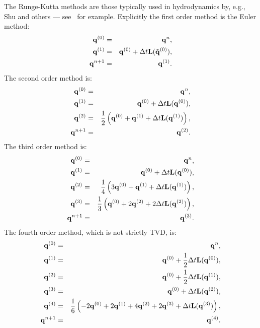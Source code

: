 The Runge-Kutta methods are those typically used in hydrodynamics by,
e.g., Shu and others --- see~\cite{CactusBase_MoL_Shu99} for
example. Explicitly the first order method is the Euler method:
\begin{eqnarray}
  \label{CactusBase_MoL_eq:rk1}
  {\bf q}^{(0)} & = & {\bf q}^{n}, \\
  {\bf q}^{(1)} & = & {\bf q}^{(0)} +  \Delta t {\bf L}(\tilde{{\bf
      q}}^{(0)}), \\
  {\bf q}^{n+1} & = & {\bf q}^{(1)}.
\end{eqnarray}
The second order method is:
\begin{eqnarray}
  \label{CactusBase_MoL_eq:rk2}
  {\bf q}^{(0)} & = & {\bf q}^{n}, \\
  {\bf q}^{(1)} & = & {\bf q}^{(0)} + \Delta t {\bf L} ({\bf q}^{(0)}), \\
  {\bf q}^{(2)} & = & \frac{1}{2} \left( {\bf q}^{(0)} + {\bf q}^{(1)}
    + \Delta t {\bf L} ({\bf q}^{(1)}) \right), \\
  {\bf q}^{n+1} & = & {\bf q}^{(2)}.
\end{eqnarray}
The third order method is:
\begin{eqnarray}
  \label{CactusBase_MoL_eq:rk3}
  {\bf q}^{(0)} & = & {\bf q}^{n}, \\
  {\bf q}^{(1)} & = & {\bf q}^{(0)} + \Delta t {\bf L} ({\bf q}^{(0)}), \\
  {\bf q}^{(2)} & = & \frac{1}{4} \left( 3 {\bf q}^{(0)} + {\bf q}^{(1)} +
    \Delta t {\bf L} ({\bf q}^{(1)}) \right), \\
  {\bf q}^{(3)} & = & \frac{1}{3} \left( {\bf q}^{(0)} + 2 {\bf
      q}^{(2)} + 2 \Delta t {\bf L} ({\bf q}^{(2)}) \right), \\
  {\bf q}^{n+1} & = & {\bf q}^{(3)}.
\end{eqnarray}
The fourth order method, which is not strictly TVD, is:
\begin{eqnarray}
  \label{CactusBase_MoL_eq:rk4}
  {\bf q}^{(0)} & = & {\bf q}^{n}, \\
  {\bf q}^{(1)} & = & {\bf q}^{(0)} + \frac{1}{2} \Delta t {\bf L}
  ({\bf q}^{(0)}), \\ 
  {\bf q}^{(2)} & = & {\bf q}^{(0)} + \frac{1}{2} \Delta t {\bf L}
  ({\bf q}^{(1)}), \\ 
  {\bf q}^{(3)} & = & {\bf q}^{(0)} + \Delta t {\bf L} ({\bf
    q}^{(2)}), \\  
  {\bf q}^{(4)} & = & \frac{1}{6} \left( - 2 {\bf q}^{(0)} + 2 {\bf
      q}^{(1)} + 4 {\bf q}^{(2)} + 2 {\bf q}^{(3)} + \Delta t{\bf L}
    ({\bf q}^{(3)}) \right), \\
  {\bf q}^{n+1} & = & {\bf q}^{(4)}.
\end{eqnarray}

